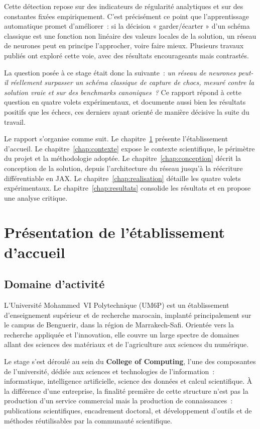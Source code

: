 \documentclass[12pt,a4paper,oneside]{report}
\begin{document}
Cette détection repose sur des indicateurs de régularité analytiques et sur des
constantes fixées empiriquement. C'est précisément ce point que
l'apprentissage automatique promet d'améliorer~: si la décision
« garder/écarter » d'un schéma classique est une fonction non linéaire des
valeurs locales de la solution, un réseau de neurones peut en principe
l'approcher, voire faire mieux. Plusieurs travaux publiés ont exploré cette
voie, avec des résultats encourageants mais contrastés.

La question posée à ce stage était donc la suivante~: \emph{un réseau de
neurones peut-il réellement surpasser un schéma classique de capture de chocs,
mesuré contre la solution vraie et sur des benchmarks canoniques~?} Ce rapport
répond à cette question en quatre volets expérimentaux, et documente aussi bien
les résultats positifs que les échecs, ces derniers ayant orienté de manière
décisive la suite du travail.

Le rapport s'organise comme suit. Le chapitre~\ref{chap:entreprise} présente
l'établissement d'accueil. Le chapitre~\ref{chap:contexte} expose le contexte
scientifique, le périmètre du projet et la méthodologie adoptée. Le
chapitre~\ref{chap:conception} décrit la conception de la solution, depuis
l'architecture du réseau jusqu'à la réécriture différentiable en JAX. Le
chapitre~\ref{chap:realisation} détaille les quatre volets expérimentaux. Le
chapitre~\ref{chap:resultats} consolide les résultats et en propose une analyse
critique.

\chapter{Présentation de l'établissement d'accueil}
\label{chap:entreprise}

\section{Domaine d'activité}

L'Université Mohammed~VI Polytechnique (UM6P) est un établissement
d'enseignement supérieur et de recherche marocain, implanté principalement sur
le campus de Benguerir, dans la région de Marrakech-Safi. Orientée vers la
recherche appliquée et l'innovation, elle couvre un large spectre de domaines
allant des sciences des matériaux et de l'agriculture aux sciences du numérique.

Le stage s'est déroulé au sein du \textbf{College of Computing}, l'une des
composantes de l'université, dédiée aux sciences et technologies de
l'information~: informatique, intelligence artificielle, science des données et
calcul scientifique. À la différence d'une entreprise, la finalité première de
cette structure n'est pas la production d'un service commercial mais la
production de connaissances~: publications scientifiques, encadrement doctoral,
et développement d'outils et de méthodes réutilisables par la communauté
scientifique.
\end{document}
